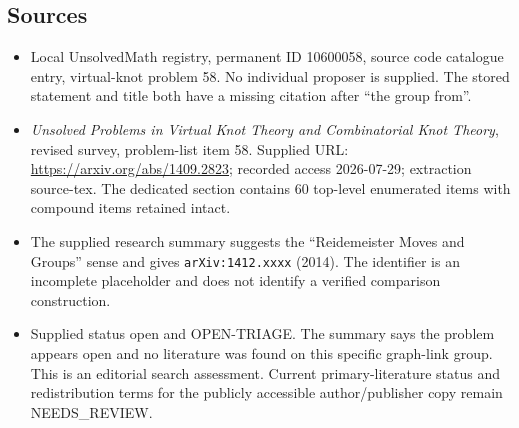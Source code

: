 \documentclass[11pt]{article}
\begin{document}
\subsection{Sources}
\begin{itemize}
\item Local UnsolvedMath registry, permanent ID 10600058, source code catalogue entry, virtual-knot problem 58. No individual proposer is supplied. The stored statement and title both have a missing citation after ``the group from''.
\item \emph{Unsolved Problems in Virtual Knot Theory and Combinatorial Knot Theory}, revised survey, problem-list item 58. Supplied URL: \url{https://arxiv.org/abs/1409.2823}; recorded access 2026-07-29; extraction source-tex. The dedicated section contains 60 top-level enumerated items with compound items retained intact.
\item The supplied research summary suggests the ``Reidemeister Moves and Groups'' sense and gives \texttt{arXiv:1412.xxxx} (2014). The identifier is an incomplete placeholder and does not identify a verified comparison construction.
\item Supplied status open and OPEN-TRIAGE. The summary says the problem appears open and no literature was found on this specific graph-link group. This is an editorial search assessment. Current primary-literature status and redistribution terms for the publicly accessible author/publisher copy remain NEEDS\_REVIEW.
\end{itemize}
\end{document}
